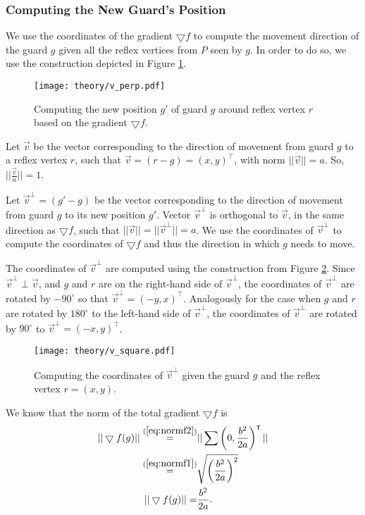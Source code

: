 \subsubsection{Computing the New Guard's Position}
We use the coordinates of the gradient $\bigtriangledown f$ to compute the movement direction of the guard $g$ given all the reflex vertices from $P$ seen by $g$. In order to do so, we  use the construction depicted in Figure \ref{fig:vperp}. 

\begin{figure}[h!]
    \centering
    \texttt{[image: theory/v\_perp.pdf]}
    \caption{Computing the new position $g'$ of guard $g$ around reflex vertex $r$ based on the gradient $\bigtriangledown f$.}
    \label{fig:vperp}
\end{figure}

Let $\vec v$ be the vector corresponding to the direction of movement from guard $g$ to a reflex vertex $r$, such that $\vec{v} = (r - g) = (x, y)^\intercal$, with norm $||\vec{v}|| = a$. So, $||\frac{\vec v}{a}|| = 1$.

Let $\vec{v}^\perp  = (g' - g)$ be the vector corresponding to the direction of movement from guard $g$ to its new position $g'$. Vector $\vec v^\perp$ is orthogonal to $\vec{v}$, in the same direction as $\bigtriangledown f$, such that $||\vec{v}|| = ||\vec{v}^\perp|| = a$. We  use the coordinates of $\vec{v}^\perp$ to compute the coordinates of $\bigtriangledown f$ and thus the direction in which $g$ needs to move.

The coordinates of $\vec v^\perp$ are computed using the construction from Figure \ref{fig:vsquare}. Since $\vec v^\perp \perp \vec v$, and $g$ and $r$ are on the right-hand side of $\vec v^\perp$, the coordinates of $\vec v^\perp$ are rotated by $-90^\circ$ so that $\vec v^\perp = (-y, x)^\intercal$. Analogously for the case when $g$ and $r$ are rotated by $180^\circ$ to the left-hand side of $\vec v^\perp$, the coordinates of $\vec v^\perp$ are rotated by $90^\circ$ to $\vec v^\perp = (-x, y)^\intercal$.

\begin{figure}[h!]
    \centering
    \texttt{[image: theory/v\_square.pdf]}
    \caption{Computing the coordinates of $\vec v^\perp$ given the guard $g$ and the reflex vertex $r = (x, y)$.}
    \label{fig:vsquare}
\end{figure}

We know that the norm of the total gradient $\bigtriangledown f$ is 
\begin{align}
    ||\bigtriangledown f(g)|| \overset{(\ref{eq:normf2})}{=} &||\sum \left(0, \frac{b^2}{2a}\right)^\intercal|| \nonumber \\
    \overset{(\ref{eq:normf1})}{=} &\sqrt{\left(\frac{b^2}{2a}\right)^2} \nonumber \\
    ||\bigtriangledown f(g)|| = &\frac{b^2}{2a}. \label{eq:normf}
\end{align}

